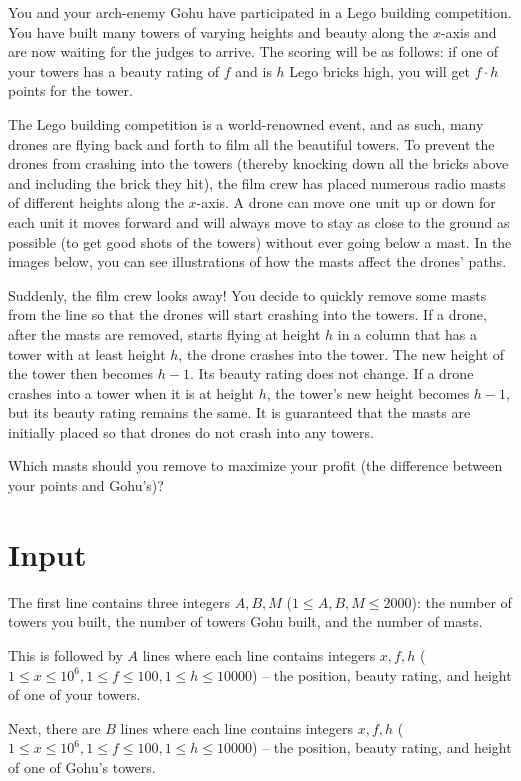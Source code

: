 \noindent
You and your arch-enemy Gohu have participated in a Lego building competition.
You have built many towers of varying heights and beauty along the $x$-axis and are now waiting for the judges to arrive.
The scoring will be as follows: if one of your towers has a beauty rating of $f$ and is $h$ Lego bricks high, you will get $f \cdot h$ points for the tower.

The Lego building competition is a world-renowned event, and as such, many drones are flying back and forth to film all the beautiful towers.
To prevent the drones from crashing into the towers (thereby knocking down all the bricks above and including the brick they hit), the film crew has placed numerous radio masts of different heights along the $x$-axis.
A drone can move one unit up or down for each unit it moves forward and will always move to stay as close to the ground as possible (to get good shots of the towers) without ever going below a mast.
In the images below, you can see illustrations of how the masts affect the drones' paths.

Suddenly, the film crew looks away!
You decide to quickly remove some masts from the line so that the drones will start crashing into the towers.
If a drone, after the masts are removed, starts flying at height $h$ in a column that has a tower with at least height $h$, the drone crashes into the tower.
The new height of the tower then becomes $h - 1$.
Its beauty rating does not change.
If a drone crashes into a tower when it is at height $h$, the tower's new height becomes $h - 1$, but its beauty rating remains the same.
It is guaranteed that the masts are initially placed so that drones do not crash into any towers.

Which masts should you remove to maximize your profit (the difference between your points and Gohu's)?

\section*{Input}
The first line contains three integers $A, B, M$ ($1 \leq A, B, M \leq 2000$): the number of towers you built, the number of towers Gohu built, and the number of masts.

This is followed by $A$ lines where each line contains integers $x, f, h$ ($1 \leq x \leq 10^6, 1 \le f \le 100, 1 \leq h \leq 10000$) -- the position, beauty rating, and height of one of your towers.

Next, there are $B$ lines where each line contains integers $x, f, h$ ($1 \leq x \leq 10^6, 1 \le f \le 100, 1 \leq h \le 10000$) -- the position, beauty rating, and height of one of Gohu's towers.

